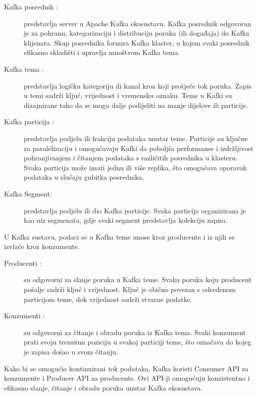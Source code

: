 \documentclass[times, utf8, diplomski]{fer}
\begin{document}
\begin{description}
	\item[Kafka posrednik :] predstavlja server u Apache Kafka ekosustavu. Kafka posrednik odgovoran je za pohranu, kategorizaciju i distribuciju poruka (ili događaja) do Kafka klijenata. Skup posrednika formira Kafka klaster, u kojem svaki posrednik efikasno skladišti i upravlja mnoštvom Kafka tema.
	
	\item[Kafka tema :] predstavlja logičku kategoriju ili kanal kroz koji protječe tok poruka. Zapis u temi sadrži ključ, vrijednost i vremensku oznaku. Teme u Kafki su dizajnirane tako da se mogu dalje podijeliti na manje dijelove ili particije.
	
	\item[Kafka particija :] predstavlja podjelu ili frakciju podataka unutar teme. Particije su ključne za paralelizaciju i omogućavaju Kafki da poboljša performanse i izdržljivost pohranjivanjem i čitanjem podataka s različitih posrednika u klasteru. Svaka particija može imati jednu ili više replika, što omogućava oporavak podataka u slučaju gubitka posrednika.
	
	\item[Kafka Segment:] predstavlja podjelu ili dio Kafka particije. Svaka particija organizirana je kao niz segmenata, gdje svaki segment predstavlja kolekciju zapisa.
\end{description}


U Kafka sustavu, podaci se u Kafka teme unose kroz producente i iz njih se izvlače kroz konzumente.

\begin{description}
	\item[Producenti :] su odgovorni za slanje poruka u Kafka teme. Svaka poruka koju producent pošalje sadrži ključ i vrijednost. Ključ je obično povezan s određenom particijom teme, dok vrijednost sadrži stvarne podatke.
	
	\item[Konzumenti :] su odgovorni za čitanje i obradu poruka iz Kafka tema. Svaki konzument prati svoju trenutnu poziciju  u svakoj particiji teme, što označava do kojeg je zapisa došao u svom čitanju.
\end{description}

Kako bi se omogućio kontinuirani tok podataka, Kafka koristi Consumer API za konzumente i Producer API za producente. Ovi API-ji omogućuju konzistentno i efikasno slanje, čitanje i obradu poruka unutar Kafka ekosustava.
\end{document}
